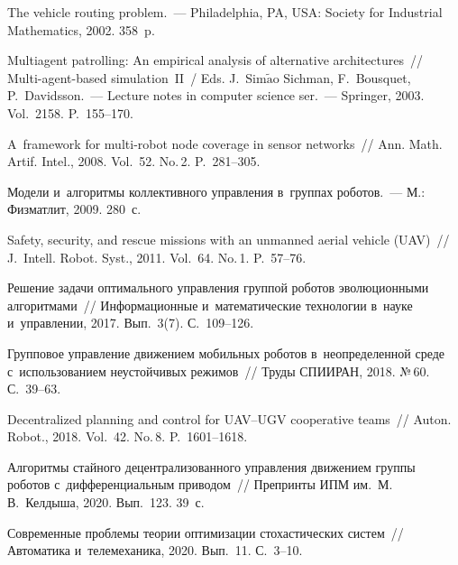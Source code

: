 \begin{multicols}{2}
{{\begin{thebibliography}{99}
 The vehicle routing problem.~--- Philadelphia, PA, USA: Society for 
Industrial Mathematics, 2002. 358~p. 

 Multiagent patrolling: An empirical 
analysis of alternative architectures~// Multi-agent-based 
simulation~II~/ Eds. J.~Sim$\tilde{\mbox{a}}$o Sichman, F.~Bousquet, P.~Davidsson.~--- 
Lecture notes in computer science ser.~--- Springer, 2003. Vol.~2158. P.~155--170. 

 A~framework for multi-robot node 
coverage in sensor networks~// Ann. Math. Artif. Intel., 2008. Vol.~52. 
No.\,2. P.~281--305. 



 Модели и~алгоритмы коллективного 
управ\-ле\-ния в~группах роботов.~--- М.: Физматлит, 2009. 280~с. 





 Safety, security, and 
rescue missions with an unmanned aerial vehicle (UAV)~// J.~Intell. Robot. Syst., 
2011. Vol.~64. No.\,1. P.~57--76. 

 Решение задачи оптимального 
управ\-ле\-ния группой роботов эволюционными алгоритмами~// Информационные 
и~математические технологии в~науке и~управ\-ле\-нии, 2017. Вып.~3(7). С.~109--126. 

 Групповое управ\-ле\-ние движением мобильных 
роботов в~неопределенной среде с~использованием неустойчивых режимов~// Труды 
\mbox{СПИИРАН}, 2018. №\,60. С.~39--63. 

 Decentralized 
planning and control for UAV--UGV cooperative teams~// Auton. Robot., 2018. Vol.~42. 
No.\,8. P.~1601--1618. 

 Алгоритмы стайного децентрализованного управ\-ле\-ния движением группы 
роботов с~дифференциальным приводом~// Препринты ИПМ им.\ М.\,В.~Келдыша, 2020. 
Вып.~123. 39~с. 

 Современные проб\-ле\-мы тео\-рии оптимизации 
стохастических сис\-тем~// Автоматика и~телемеханика, 2020. Вып.~11. С.~3--10. 


\end{thebibliography}}}
\end{multicols}
